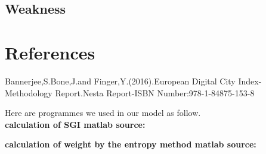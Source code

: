 \documentclass{mcmthesis}
\begin{document}
\subsection{Weakness}%



\section{References}
\begin{thebibliography}{99}
Bannerjee,S.Bone,J.and Finger,Y.(2016).European Digital City Index-Methodology Report.Nesta Report-ISBN Number:978-1-84875-153-8
\end{thebibliography}

\begin{appendices}
Here are  programmes we used in our model as follow.\\
\textbf{\textcolor[rgb]{0.98,0.00,0.00}{calculation of SGI matlab source:}}

\textbf{\textcolor[rgb]{0.98,0.00,0.00}{calculation of weight by the entropy method matlab source:}}
\noindent{}
\end{appendices}
\end{document}

